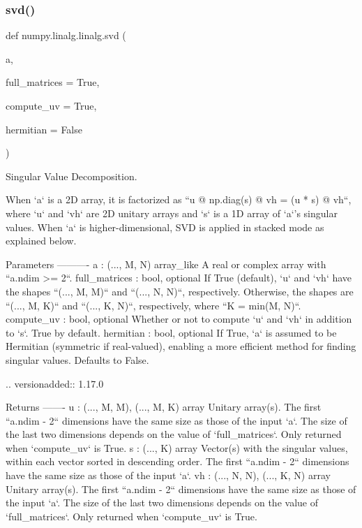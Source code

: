 \subsubsection{\texorpdfstring{svd()}{svd()}}
{\footnotesize\ttfamily def numpy.\+linalg.\+linalg.\+svd (\begin{DoxyParamCaption}\item[{}]{a,  }\item[{}]{full\+\_\+matrices = {\ttfamily True},  }\item[{}]{compute\+\_\+uv = {\ttfamily True},  }\item[{}]{hermitian = {\ttfamily False} }\end{DoxyParamCaption})}

\begin{DoxyVerb}Singular Value Decomposition.

When `a` is a 2D array, it is factorized as ``u @ np.diag(s) @ vh
= (u * s) @ vh``, where `u` and `vh` are 2D unitary arrays and `s` is a 1D
array of `a`'s singular values. When `a` is higher-dimensional, SVD is
applied in stacked mode as explained below.

Parameters
----------
a : (..., M, N) array_like
    A real or complex array with ``a.ndim >= 2``.
full_matrices : bool, optional
    If True (default), `u` and `vh` have the shapes ``(..., M, M)`` and
    ``(..., N, N)``, respectively.  Otherwise, the shapes are
    ``(..., M, K)`` and ``(..., K, N)``, respectively, where
    ``K = min(M, N)``.
compute_uv : bool, optional
    Whether or not to compute `u` and `vh` in addition to `s`.  True
    by default.
hermitian : bool, optional
    If True, `a` is assumed to be Hermitian (symmetric if real-valued),
    enabling a more efficient method for finding singular values.
    Defaults to False.

    .. versionadded:: 1.17.0

Returns
-------
u : { (..., M, M), (..., M, K) } array
    Unitary array(s). The first ``a.ndim - 2`` dimensions have the same
    size as those of the input `a`. The size of the last two dimensions
    depends on the value of `full_matrices`. Only returned when
    `compute_uv` is True.
s : (..., K) array
    Vector(s) with the singular values, within each vector sorted in
    descending order. The first ``a.ndim - 2`` dimensions have the same
    size as those of the input `a`.
vh : { (..., N, N), (..., K, N) } array
    Unitary array(s). The first ``a.ndim - 2`` dimensions have the same
    size as those of the input `a`. The size of the last two dimensions
    depends on the value of `full_matrices`. Only returned when
    `compute_uv` is True.


\end{DoxyVerb}
